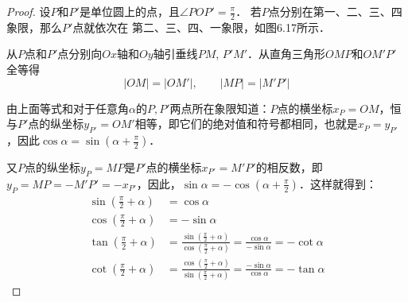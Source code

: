 \begin{proof}
    设$P$和$P'$是单位圆上的点，且$\angle POP'=\frac{\pi}{2}$．
    若$P$点分别在第一、二、三、四象限，那么$P'$点就依次在
    第二、三、四、一象限，如图6.17所示．
\begin{figure}[htp]
    \centering
{}
    \caption{}
\end{figure}

    从$P$点和$P'$点分别向$Ox$轴和$Oy$轴引垂线$PM$, $P'M'$．从直角三角形$OMP$和$OM'P'$全等得
\[|OM|=|OM'|,\qquad |MP|=|M'P'|\]
    
由上面等式和对于任意角$\alpha$的$P,P'$两点所在象限知道：$P$点的横坐标$x_P=OM$，恒与$P'$点的纵坐标$y_{P'}=OM'$相等，即它们的绝对值和符号都相同，也就是$x_P=y_{P'}$，因此$\cos\alpha=\sin\left(\alpha+\frac{\pi}{2}\right)$．

又$P$点的纵坐标$y_P=MP$是$P'$点的横坐标$x_{P'}=M'P'$的相反数，即$y_P=MP=-M'P'=-x_{P'}$，因此，$\sin\alpha=-\cos\left(\alpha+\frac{\pi}{2}\right)$．这样就得到：
\[\begin{split}
    \sin\left(\frac{\pi}{2}+\alpha\right)&=\cos\alpha\\
    \cos\left(\frac{\pi}{2}+\alpha\right)&=-\sin\alpha\\
    \tan\left(\frac{\pi}{2}+\alpha\right)&=\frac{\sin\left(\frac{\pi}{2}+\alpha\right)}{\cos\left(\frac{\pi}{2}+\alpha\right)}=\frac{\cos\alpha}{-\sin\alpha}=-\cot\alpha\\
    \cot\left(\frac{\pi}{2}+\alpha\right)&=\frac{\cos\left(\frac{\pi}{2}+\alpha\right)}{\sin \left(\frac{\pi}{2}+\alpha\right)}=\frac{-\sin\alpha}{\cos\alpha}=-\tan\alpha
\end{split}\]
\end{proof}

